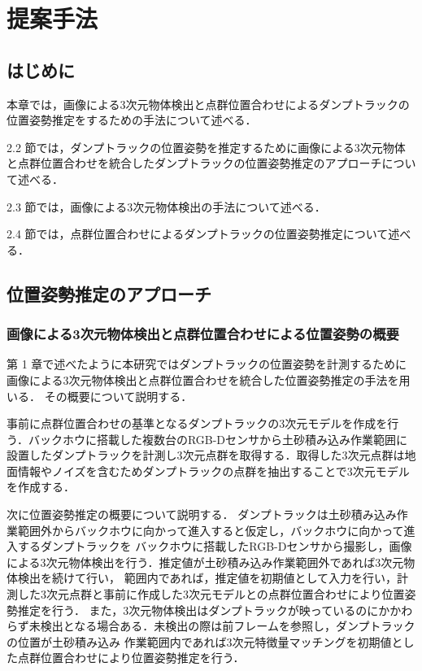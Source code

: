 \chapter{提案手法}
\thispagestyle{empty}
\label{chap2}
\minitoc

\newpage
\section{はじめに}
本章では，画像による3次元物体検出と点群位置合わせによるダンプトラックの位置姿勢推定をするための手法について述べる．
\par
2.2 節では，ダンプトラックの位置姿勢を推定するために画像による3次元物体と点群位置合わせを統合したダンプトラックの位置姿勢推定のアプローチについて述べる．
\par
2.3 節では，画像による3次元物体検出の手法について述べる．
\par
2.4 節では，点群位置合わせによるダンプトラックの位置姿勢推定について述べる．
\newpage

\section{位置姿勢推定のアプローチ}
\subsection{画像による3次元物体検出と点群位置合わせによる位置姿勢の概要}
第 1 章で述べたように本研究ではダンプトラックの位置姿勢を計測するために画像による3次元物体検出と点群位置合わせを統合した位置姿勢推定の手法を用いる．
その概要について説明する．
\par
事前に点群位置合わせの基準となるダンプトラックの3次元モデルを作成を行う．バックホウに搭載した複数台のRGB-Dセンサから土砂積み込み作業範囲に
設置したダンプトラックを計測し3次元点群を取得する．取得した3次元点群は地面情報やノイズを含むためダンプトラックの点群を抽出することで3次元モデルを作成する．
\par
次に位置姿勢推定の概要について説明する．
ダンプトラックは土砂積み込み作業範囲外からバックホウに向かって進入すると仮定し，バックホウに向かって進入するダンプトラックを
バックホウに搭載したRGB-Dセンサから撮影し，画像による3次元物体検出を行う．推定値が土砂積み込み作業範囲外であれば3次元物体検出を続けて行い，
範囲内であれば，推定値を初期値として入力を行い，計測した3次元点群と事前に作成した3次元モデルとの点群位置合わせにより位置姿勢推定を行う．
また，3次元物体検出はダンプトラックが映っているのにかかわらず未検出となる場合ある．未検出の際は前フレームを参照し，ダンプトラックの位置が土砂積み込み
作業範囲内であれば3次元特徴量マッチングを初期値とした点群位置合わせにより位置姿勢推定を行う．
\newpage
